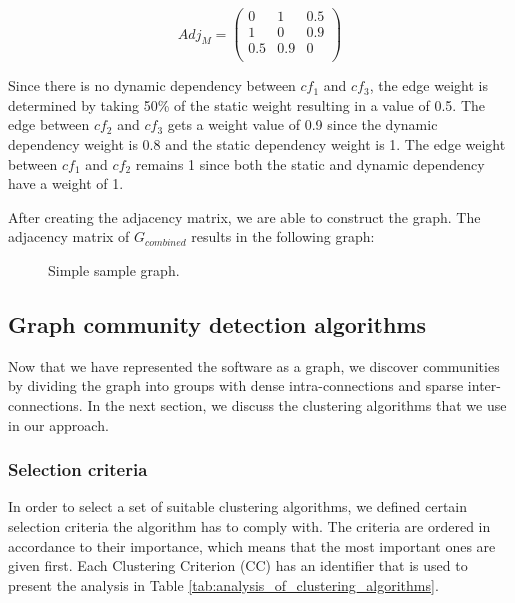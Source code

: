 \begin{equation*}
    Adj_M = 
    \begin{pmatrix}
    0&1&0.5\\
    1&0&0.9\\
    0.5&0.9&0\\
    \end{pmatrix}
\end{equation*}

Since there is no dynamic dependency between $cf_1$ and $cf_3$, the edge weight is determined by taking 50\% of the static weight resulting in a value of 0.5. The edge between $cf_2$ and $cf_3$ gets a weight value of 0.9 since the dynamic dependency weight is 0.8 and the static dependency weight is 1. The edge weight between $cf_1$ and $cf_2$ remains 1 since both the static and dynamic dependency have a weight of 1. \par
After creating the adjacency matrix, we are able to construct the graph. The adjacency matrix of $G_{combined}$ results in the following graph:

\begin{figure}[ht]
    \centering
    \caption{Simple sample graph.}
\end{figure}

\subsection{Graph community detection algorithms}\label{ss:graph_algorithms}
Now that we have represented the software as a graph, we discover communities by dividing the graph into groups with dense intra-connections and sparse inter-connections. In the next section, we discuss the clustering algorithms that we use in our approach.

\subsubsection{Selection criteria}\label{sss:selection_criteria_clustering_algo}
In order to select a set of suitable clustering algorithms, we defined certain selection criteria the algorithm has to comply with. The criteria are ordered in accordance to their importance, which means that the most important ones are given first. Each Clustering Criterion (CC) has an identifier that is used to present the analysis in Table \ref{tab:analysis_of_clustering_algorithms}.

